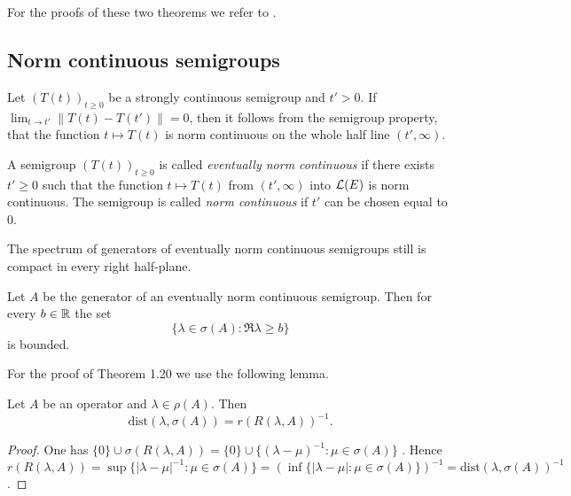 For the proofs of these two theorems we refer to \citet[Chapter 3, Theorem 4.7 and 4.8]{pazy:1983}.

\subsection{Norm continuous semigroups} \label{subsec:a2-1.se6}

Let $(T(t))_{t\geq 0}$ be a strongly continuous semigroup and $t' > 0$.
If $\lim_{t \to t'} \|T(t) - T(t')\| = 0$, then it follows from the semigroup property, that the function $t \mapsto T(t)$ is norm continuous on the whole half line $(t',\infty)$.

\begin{definition}\label{def:a2-1.19}
A semigroup $(T(t))_{t\geq 0}$ is called \emph{eventually norm continuous} if there exists $t' \geq 0$ such that the function $t \mapsto T(t)$ from $(t',\infty)$ into $\mathcal{L}(E)$ is norm continuous.
The semigroup is called \emph{norm continuous} if $t'$ can be chosen equal to $0$.
\end{definition}

The spectrum of generators of eventually norm continuous semigroups still is compact in every right half-plane.

\begin{theorem}\label{thm:a2-1.20}
Let $A$ be the generator of an eventually norm continuous semigroup.
Then for every $b \in \mathbb{R}$ the set
\[
    \{\lambda \in \sigma(A) \colon \Re\lambda \geq b\}
\]
is bounded.
\end{theorem}
For the proof of Theorem 1.20 we use the following lemma.

\begin{lemma}\label{lem:a2-1.21}
Let $A$ be an operator and $\lambda \in \rho(A)$.
Then
\[
    \text{dist}(\lambda,\sigma(A)) = r(R(\lambda,A))^{-1}.
\]
\end{lemma}

\begin{proof}
One has $\{0\} \cup \sigma(R(\lambda,A)) = \{0\} \cup \{(\lambda-\mu)^{-1} \colon \mu \in \sigma(A)\}$ \citet[Lemma 2.11]{davies:1980}.
Hence $r(R(\lambda,A)) = \sup \{|\lambda-\mu|^{-1} \colon \mu \in \sigma(A)\} = 
(\inf \{|\lambda-\mu| \colon \mu \in \sigma(A)\})^{-1} = \text{dist}(\lambda,\sigma(A))^{-1}$.
\end{proof}

